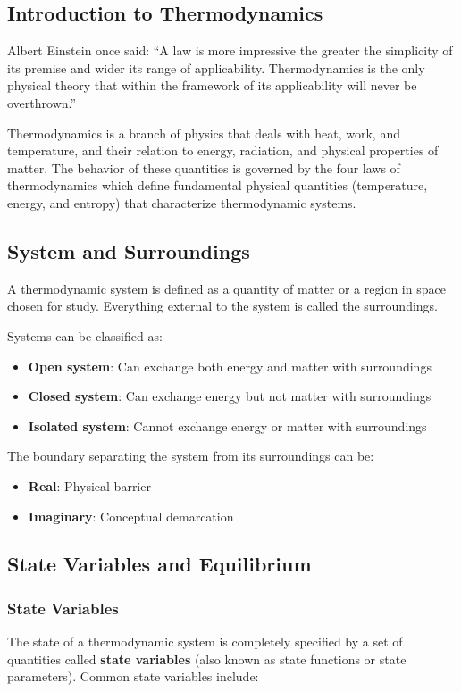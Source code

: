 \documentclass{article}
\theoremstyle{definition}
\begin{document}
\subsection{Introduction to Thermodynamics}

Albert Einstein once said: ``A law is more impressive the greater the simplicity of its premise and wider its range of applicability. Thermodynamics is the only physical theory that within the framework of its applicability will never be overthrown.''

Thermodynamics is a branch of physics that deals with heat, work, and temperature, and their relation to energy, radiation, and physical properties of matter. The behavior of these quantities is governed by the four laws of thermodynamics which define fundamental physical quantities (temperature, energy, and entropy) that characterize thermodynamic systems.

\subsection{System and Surroundings}

A thermodynamic system is defined as a quantity of matter or a region in space chosen for study. Everything external to the system is called the surroundings.

Systems can be classified as:
\begin{itemize}
    \item \textbf{Open system}: Can exchange both energy and matter with surroundings
    \item \textbf{Closed system}: Can exchange energy but not matter with surroundings
    \item \textbf{Isolated system}: Cannot exchange energy or matter with surroundings
\end{itemize}

The boundary separating the system from its surroundings can be:
\begin{itemize}
    \item \textbf{Real}: Physical barrier
    \item \textbf{Imaginary}: Conceptual demarcation
\end{itemize}

\subsection{State Variables and Equilibrium}

\subsubsection{State Variables}
The state of a thermodynamic system is completely specified by a set of quantities called \textbf{state variables} (also known as state functions or state parameters). Common state variables include:
\end{document}
